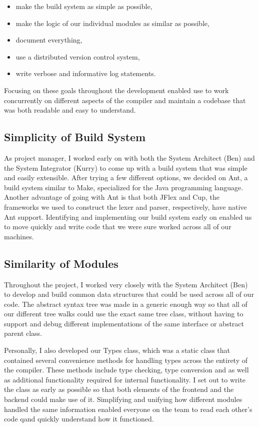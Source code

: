 \documentclass{book}
\begin{document}
\begin{itemize}
\item make the build system as simple as possible,
\item make the logic of our individual modules as similar as possible,
\item document everything,
\item use a distributed version control system,
\item write verbose and informative log statements.
\end{itemize}

Focusing on these goals throughout the development enabled use to work concurrently
on different aspects of the compiler and maintain a codebase that was both readable
and easy to understand.  

\subsection{Simplicity of Build System}

As project manager, I worked early on with both the System Architect (Ben) and
the System Integrator (Kurry) to come up with a build system that was simple and
easily extensible. After trying a few different options, we decided on Ant,
a build system similar to Make, specialized for the Java programming language.
Another advantage of going with Ant is that both JFlex and Cup, the frameworks
we used to construct the lexer and parser, respectively, have native Ant support.
Identifying and implementing our build system early on enabled us to move quickly
and write code that we were sure worked across all of our machines. 

\subsection{Similarity of Modules}

Throughout the project, I worked very closely with the System Architect (Ben) to
develop and build common data structures that could be used across all of our
code. The abstract syntax tree was made in a generic enough way so that all
of our different tree walks could use the exact same tree class, without having
to support and debug different implementations of the same interface or abstract
parent class.  

Personally, I also developed our Types class, which was a static class that
contained several convenience methods for handling types across the entirety
of the compiler. These methods include type checking, type conversion and
as well as additional functionality required for internal functionality. I
set out to write the class as early as possible so that both elements of
the frontend and the backend could make use of it. Simplifying and unifying how
different modules handled the same information enabled everyone on the team to
read each other's code qand quickly understand how it functioned.
\end{document}
